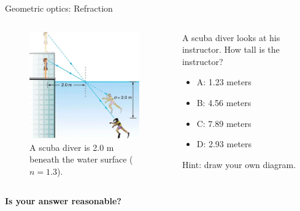 \documentclass{beamer}
\begin{document}
\begin{frame}{Geometric optics: Refraction}
\begin{columns}[T]
\begin{column}{0.5\textwidth}
\begin{figure}
\centering
\includegraphics[width=0.95\textwidth]{figures/scuba.png}
\caption{\label{fig:scuba3} \footnotesize A scuba diver is 2.0 m beneath the water surface ($n=1.3$).}
\end{figure}
\end{column}
\begin{column}{0.5\textwidth}
\footnotesize
A scuba diver looks at his instructor.  How tall is the instructor?
\begin{itemize}
\item A: 1.23 meters
\item B: 4.56 meters
\item C: 7.89 meters
\item D: 2.93 meters
\end{itemize}
\footnotesize Hint: draw your own diagram.
\end{column}
\end{columns}
\footnotesize
\textbf{\alert{Is your answer reasonable?}}
\end{frame}
\end{document}
